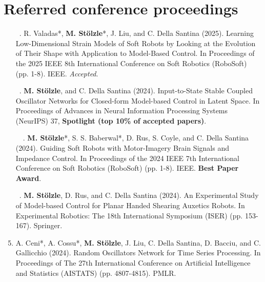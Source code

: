 \section*{Referred conference proceedings}

\begin{enumerate}
    \item[\faFileTextO \, \stepcounter{enumi}\arabic{enumi}.] R. Valadas*, \textbf{M. Stölzle}*, J. Liu, and C. Della Santina (2025). Learning Low-Dimensional Strain Models of Soft Robots by Looking at the Evolution of Their Shape with Application to Model-Based Control. In Proceedings of the 2025 IEEE 8th International Conference on Soft Robotics (RoboSoft) (pp. 1-8). IEEE. \emph{Accepted}.
    \item[\faFileTextO \, \stepcounter{enumi}\arabic{enumi}.] \textbf{M. Stölzle}, and C. Della Santina (2024). Input-to-State Stable Coupled Oscillator Networks for Closed-form Model-based Control in Latent Space. In Proceedings of Advances in Neural Information Processing Systems (NeurIPS) 37, \textbf{Spotlight (top 10\% of accepted papers)}.
    \item[\faFileTextO \, \faTrophy \, \stepcounter{enumi}\arabic{enumi}.] \textbf{M. Stölzle}*, S. S. Baberwal*, D. Rus, S. Coyle, and C. Della Santina (2024). Guiding Soft Robots with Motor-Imagery Brain Signals and Impedance Control. In Proceedings of the 2024 IEEE 7th International Conference on Soft Robotics (RoboSoft) (pp. 1-8). IEEE. \textbf{Best Paper Award}.
    \item[\faFileTextO \, \stepcounter{enumi}\arabic{enumi}.] \textbf{M. Stölzle}, D. Rus, and C. Della Santina (2024). An Experimental Study of Model-based Control for Planar Handed Shearing Auxetics Robots. In Experimental Robotics: The 18th International Symposium (ISER) (pp. 153-167). Springer.
    \item A. Ceni*, A. Cossu*, \textbf{M. Stölzle}, J. Liu, C. Della Santina, D. Bacciu, and C. Gallicchio (2024). Random Oscillators Network for Time Series Processing. In Proceedings of The 27th International Conference on Artificial Intelligence and Statistics (AISTATS) (pp. 4807-4815). PMLR.

\end{enumerate}
